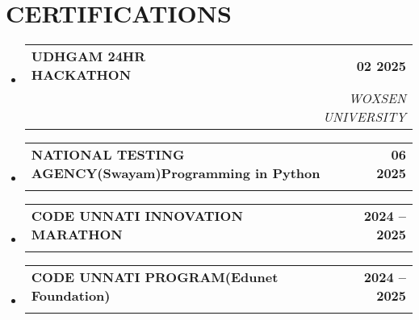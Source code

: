 \documentclass[letterpaper,11pt]{article}
\makeatletter
\newcommand{\resumeSubheading}[4]{
  \vspace{-2pt}\item
    \begin{tabular*}{1.0\textwidth}[t]{l@{\extracolsep{\fill}}r}
      \textbf{\large#1} & \textbf{\small #2} \\
      \textit{\large#3} & \textit{\small #4} \\
     
    \end{tabular*}\vspace{-7pt}
}
\newcommand{\resumeSubHeadingListStart}{\begin{itemize}[leftmargin=0.0in, label={}]}
\newcommand{\resumeSubHeadingListEnd}{\end{itemize}}
\makeatother
\begin{document}
 \vspace{-11pt}
 
\section{CERTIFICATIONS}
\resumeSubHeadingListStart
        \resumeSubheading{UDHGAM 24HR HACKATHON  \href{https://www.linkedin.com/in/gaganasindhu-pothapragada-a392612a5/details/certifications/1741521217528/single-media-viewer/?profileId=ACoAAEmK2o0BvhoUKa8NSARJlfTg_tzzjBM_Z5M}{\raisebox{-0.1\height}\faExternalLink } }{02 2025}{\underline{}}{WOXSEN UNIVERSITY}
         \resumeSubHeadingListEnd
         \resumeSubHeadingListStart
        \resumeSubheading{NATIONAL TESTING AGENCY(Swayam)Programming in Python\href{https://www.linkedin.com/in/gaganasindhu-pothapragada-a392612a5/details/certifications/1751424709432/single-media-viewer/?profileId=ACoAAEmK2o0BvhoUKa8NSARJlfTg_tzzjBM_Z5M}{\raisebox{-0.1\height}\faExternalLink } }{06 2025}{\underline{}}{}
        \resumeSubHeadingListEnd
         \resumeSubHeadingListStart
         \resumeSubheading{CODE UNNATI INNOVATION MARATHON \href{https://www.linkedin.com/in/gaganasindhu-pothapragada-a392612a5/details/certifications/1744125148722/single-media-viewer/?profileId=ACoAAEmK2o0BvhoUKa8NSARJlfTg_tzzjBM_Z5M}{\raisebox{-0.1\height}\faExternalLink } }{2024 -- 2025}{\underline{}}{}
         \resumeSubHeadingListEnd
         \resumeSubHeadingListStart
        \resumeSubheading{CODE UNNATI PROGRAM(Edunet Foundation)\href{https://www.linkedin.com/in/gaganasindhu-pothapragada-a392612a5/details/certifications/1744560831069/single-media-viewer/?profileId=ACoAAEmK2o0BvhoUKa8NSARJlfTg_tzzjBM_Z5M}{\raisebox{-0.1\height}\faExternalLink } }{2024 -- 2025}{\underline{}}{}
        
        
        
    \resumeSubHeadingListEnd
 \vspace{-11pt}
 
\end{document}
